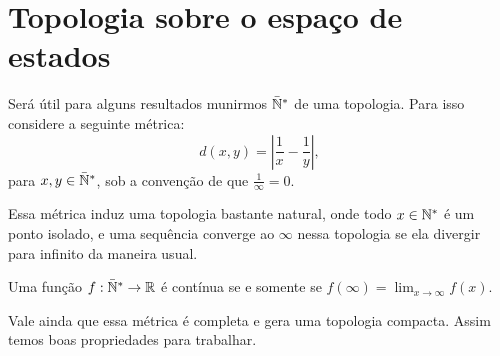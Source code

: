 \section{Topologia sobre o espaço de estados}
\label{sec:topologia}

Será útil para alguns resultados munirmos ${\mathbb{\bar{N}^*}}$ de uma
topologia. Para isso considere a seguinte métrica:
\begin{equation}
  \label{eq:metrica}
  d(x, y) = \left\lvert \frac{1}{x} - \frac{1}{y} \right\rvert,
\end{equation}
para $x, y \in {\mathbb{\bar{N}^*}}$, sob a convenção de que $\frac{1}{\infty} = 0$.

Essa métrica induz uma topologia bastante natural, onde todo $x \in
{\mathbb{N^*}}$ é um ponto isolado, e uma sequência converge ao $\infty$ nessa
topologia se ela divergir para infinito da maneira usual.

Uma função $f: {\mathbb{\bar{N}^*}} \to {\mathbb{R}}$ é contínua se e somente se $f(\infty) =
\lim_{x \to \infty} f(x)$.

Vale ainda que essa métrica é completa e gera uma topologia
compacta. Assim temos boas propriedades para trabalhar.

